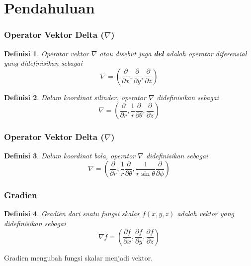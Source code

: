 \documentclass[10pt]{beamer}
\newtheorem{definisi}{Definisi}
\begin{document}
\section{Pendahuluan}

\begin{frame}
    \frametitle{Operator Vektor Delta ($\nabla$)}
    \begin{definisi}
        Operator vektor $\nabla$ atau disebut juga \textbf{del} adalah operator diferensial yang didefinisikan sebagai
        \begin{equation}
            \nabla = \left(\frac{\partial}{\partial x}, \frac{\partial}{\partial y}, \frac{\partial}{\partial z}\right)
        \end{equation}
    \end{definisi}
    \begin{definisi}
        Dalam koordinat silinder, operator $\nabla$ didefinisikan sebagai
        \begin{equation}
            \nabla = \left(\frac{\partial}{\partial r}, \frac{1}{r}\frac{\partial}{\partial \theta}, \frac{\partial}{\partial z}\right)
        \end{equation}
    \end{definisi}
\end{frame}

\begin{frame}
    \frametitle{Operator Vektor Delta ($\nabla$)}
    \begin{definisi}
        Dalam koordinat bola, operator $\nabla$ didefinisikan sebagai
        \begin{equation}
            \nabla = \left(\frac{\partial}{\partial r}, \frac{1}{r}\frac{\partial}{\partial \theta}, \frac{1}{r\sin\theta}\frac{\partial}{\partial \phi}\right)
        \end{equation}
    \end{definisi}
\end{frame}

\begin{frame}
    \frametitle{Gradien}
    \begin{definisi}
        Gradien dari suatu fungsi skalar $f(x,y,z)$ adalah vektor yang didefinisikan sebagai
        \begin{equation}
            \nabla f = \left(\frac{\partial f}{\partial x}, \frac{\partial f}{\partial y}, \frac{\partial f}{\partial z}\right)
        \end{equation}
    \end{definisi}
    Gradien mengubah fungsi skalar menjadi vektor.
\end{frame}
\end{document}
